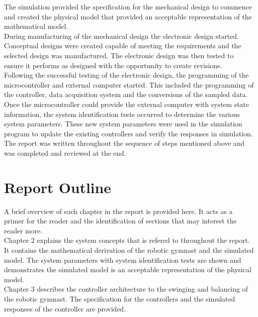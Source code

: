 The simulation provided the specification for the mechanical design to commence and created the physical model that provided an acceptable representation of the mathematical model.\\

During manufacturing of the mechanical design the electronic design started. Conceptual designs were created capable of meeting the requirements and the selected design was manufactured. The electronic design was then tested to ensure it performs as designed with the opportunity to create revisions.\\

Following the successful testing of the electronic design, the programming of the microcontroller and external computer started. This included the programming of the controller, data acquisition system and the conversions of the sampled data.\\

Once the microcontroller could provide the external computer with system state information, the system identification tests occurred to determine the various system parameters. These new system parameters were used in the simulation program to update the existing controllers and verify the responses in simulation.\\

The report was written throughout the sequence of steps mentioned above and was completed and reviewed at the end.


\section{Report Outline}

A brief overview of each chapter in the report is provided here. It acts as a primer for the reader and the identification of sections that may interest the reader more.\\

Chapter 2 explains the system concepts that is refered to throughout the report. It contains the mathematical derivation of the robotic gymnast and the simulated model. The system parameters with system identification tests are shown and demonstrates the simulated model is an acceptable representation of the physical model.\\

Chapter 3 describes the controller architecture to the swinging and balancing of the robotic gymnast. The specification for the controllers and the simulated responses of the controller are provided.\\

